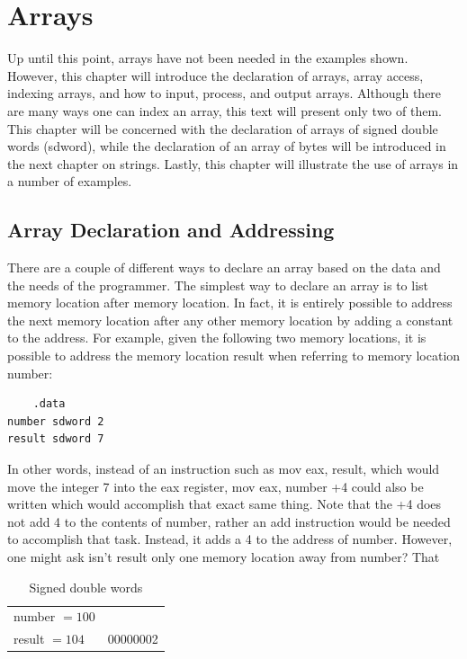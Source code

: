 \documentclass[10pt]{book}
\begin{document}
\section{Arrays}
Up until this point, arrays have not been needed in the examples shown. However, this chapter will introduce the declaration of arrays, array access, indexing arrays, and how to input, process, and output arrays. Although there are many ways one can index an array, this text will present only two of them. This chapter will be concerned with the declaration of arrays of signed double words (sdword), while the declaration of an array of bytes will be introduced in the next chapter on strings. Lastly, this chapter will illustrate the use of arrays in a number of examples.

\subsection{Array Declaration and Addressing}
There are a couple of different ways to declare an array based on the data and the needs of the programmer. The simplest way to declare an array is to list memory location after memory location. In fact, it is entirely possible to address the next memory location after any other memory location by adding a constant to the address. For example, given the following two memory locations, it is possible to address the memory location result when referring to memory location number:

\begin{verbatim}
    .data
number sdword 2
result sdword 7
\end{verbatim}

In other words, instead of an instruction such as mov eax, result, which would move the integer 7 into the eax register, mov eax, number +4 could also be written which would accomplish that exact same thing. Note that the +4 does not add 4 to the contents of number, rather an add instruction would be needed to accomplish that task. Instead, it adds a 4 to the address of number. However, one might ask isn't result only one memory location away from number? That

\begin{table}[h]
\centering
\begin{tabular}{ll}
\hline
number $=100$ & \\
result $=104$ & 00000002 \\
\hline
\end{tabular}
\caption{Signed double words}
\end{table}
\end{document}
